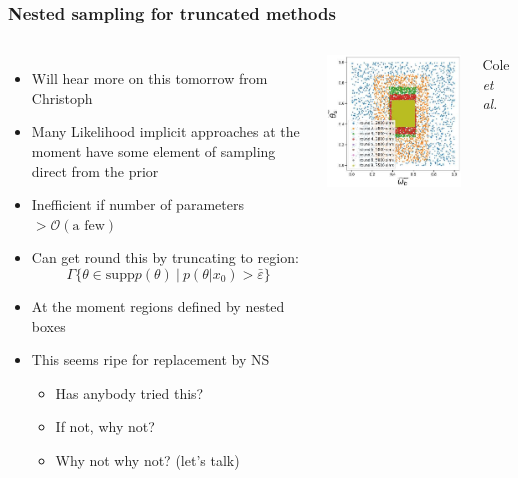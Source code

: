 \documentclass[aspectratio=169]{beamer}
\begin{document}
\begin{frame}
    \frametitle{Nested sampling for truncated methods}

    \begin{columns}
        \begin{itemize}
            \item Will hear more on this tomorrow from Christoph
            \item Many Likelihood implicit approaches at the moment have some element of sampling direct from the prior
            \item Inefficient if number of parameters $>\mathcal{O}(\text{a few})$
            \item Can get round this by truncating to region:
                \[ \Gamma\{ \theta\in \mathrm{supp} p(\theta) \:|\: p(\theta|x_0)>\bar\varepsilon\} \]
            \item At the moment regions defined by nested boxes
            \item This seems ripe for replacement by NS
                \begin{itemize}
                    \item Has anybody tried this?
                    \item If not, why not?
                    \item Why not why not? \hfill(let's talk)
                \end{itemize}
        \end{itemize}
        \includegraphics[width=\textwidth]{figures/tmnre}

        \hfill Cole \textit{et al.}~
    \end{columns}
    
\end{frame}
\end{document}
